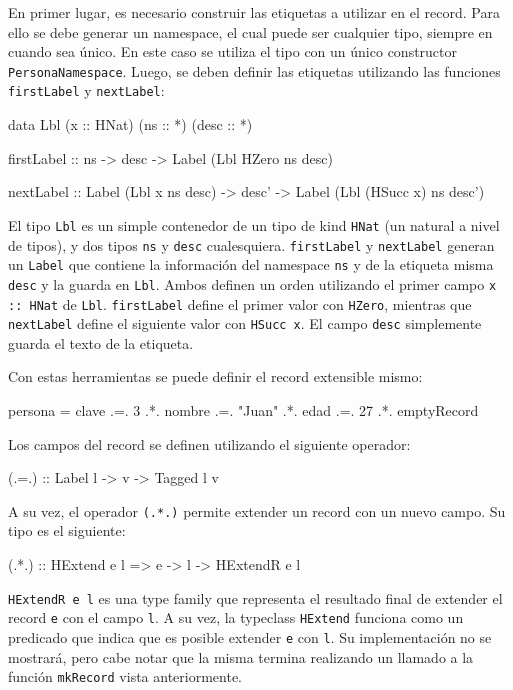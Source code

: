 En primer lugar, es necesario construir las etiquetas a utilizar en el record. Para ello se debe generar un namespace, el cual puede ser cualquier tipo, siempre en cuando sea único. En este caso se utiliza el tipo con un único constructor \texttt{PersonaNamespace}. Luego, se deben definir las etiquetas utilizando las funciones \texttt{firstLabel} y \texttt{nextLabel}:

\begin{code}
data Lbl (x :: HNat) (ns :: *) (desc :: *)

firstLabel :: ns -> desc -> Label (Lbl HZero ns desc)

nextLabel :: Label (Lbl x ns desc) -> desc' ->
  Label (Lbl (HSucc x) ns desc')
\end{code}

El tipo \texttt{Lbl} es un simple contenedor de un tipo de kind \texttt{HNat} (un natural a nivel de tipos), y dos tipos \texttt{ns} y \texttt{desc} cualesquiera. \texttt{firstLabel} y \texttt{nextLabel} generan un \texttt{Label} que contiene la información del namespace \texttt{ns} y de la etiqueta misma \texttt{desc} y la guarda en \texttt{Lbl}. Ambos definen un orden utilizando el primer campo \texttt{x :: HNat} de \texttt{Lbl}. \texttt{firstLabel} define el primer valor con \texttt{HZero}, mientras que \texttt{nextLabel} define el siguiente valor con \texttt{HSucc x}. El campo \texttt{desc} simplemente guarda el texto de la etiqueta.

Con estas herramientas se puede definir el record extensible mismo:

\begin{code}
persona = clave .=. 3
  .*. nombre .=. "Juan"
  .*. edad .=. 27
  .*. emptyRecord
\end{code}

Los campos del record se definen utilizando el siguiente operador:

\begin{code}
(.=.) :: Label l -> v -> Tagged l v
\end{code}

A su vez, el operador \texttt{(.*.)} permite extender un record con un nuevo campo. Su tipo es el siguiente:

\begin{code}
(.*.) :: HExtend e l => e -> l -> HExtendR e l
\end{code}

\texttt{HExtendR e l} es una type family que representa el resultado final de extender el record \texttt{e} con el campo \texttt{l}. A su vez, la typeclass \texttt{HExtend} funciona como un predicado que indica que es posible extender \texttt{e} con \texttt{l}. Su implementación no se mostrará, pero cabe notar que la misma termina realizando un llamado a la función \texttt{mkRecord} vista anteriormente.

